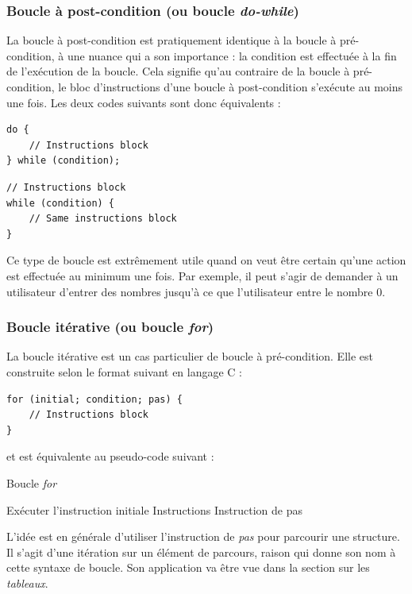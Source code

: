 \documentclass[../../../main.tex]{subfiles}
\begin{document}
\subsubsection{Boucle à post-condition (ou boucle \textit{do-while})}
 
La boucle à post-condition est pratiquement identique à la boucle à pré-condition, à une nuance qui a son importance : la condition est effectuée à la fin de l'exécution de la boucle. Cela signifie qu'au contraire de la boucle à pré-condition, le bloc d'instructions d'une boucle à post-condition s'exécute au moins une fois. Les deux codes suivants sont donc équivalents :
 
\begin{minipage}{0.5\textwidth}
\begin{verbatim}
do {
	// Instructions block
} while (condition);

\end{verbatim}
\end{minipage}
\begin{minipage}{0.5\textwidth}
\begin{verbatim}
// Instructions block
while (condition) {
	// Same instructions block
}
\end{verbatim}
\end{minipage}
 
Ce type de boucle est extrêmement utile quand on veut être certain qu'une action est effectuée au minimum une fois. Par exemple, il peut s'agir de demander à un utilisateur d'entrer des nombres jusqu'à ce que l'utilisateur entre le nombre $0$.
 
\subsubsection{Boucle itérative (ou boucle \textit{for})}
 
La boucle itérative est un cas particulier de boucle à pré-condition. Elle est construite selon le format suivant en langage C :
\begin{verbatim}
for (initial; condition; pas) {
	// Instructions block
}
\end{verbatim}
et est équivalente au pseudo-code suivant :
\begin{algorithm}
\caption{Boucle \textit{for}}
Exécuter l'instruction initiale\;
 {
	Instructions 
	Instruction de pas 
}
\end{algorithm} \newline
L'idée est en générale d'utiliser l'instruction de \textit{pas} pour parcourir une structure. Il s'agit d'une itération sur un élément de parcours, raison qui donne son nom à cette syntaxe de boucle. Son application va être vue dans la section sur les \textit{tableaux}.
 
\end{document}
